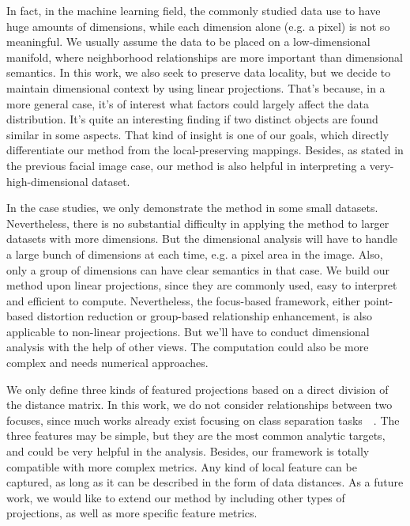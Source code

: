 In fact, in the machine learning field, the commonly studied data use to have huge amounts of dimensions, while each dimension alone (e.g. a pixel) is not so meaningful. We usually assume the data to be placed on a low-dimensional manifold, where neighborhood relationships are more important than dimensional semantics. In this work, we also seek to preserve data locality, but we decide to maintain dimensional context by using linear projections. That's because, in a more general case, it's of interest what factors could largely affect the data distribution. It's quite an interesting finding if two distinct objects are found similar in some aspects. That kind of insight is one of our goals, which directly differentiate our method from the local-preserving mappings. Besides, as stated in the previous facial image case, our method is also helpful in interpreting a very-high-dimensional dataset.

In the case studies, we only demonstrate the method in some small datasets. Nevertheless, there is no substantial difficulty in applying the method to larger datasets with more dimensions. But the dimensional analysis will have to handle a large bunch of dimensions at each time, e.g. a pixel area in the image. Also, only a group of dimensions can have clear semantics in that case. We build our method upon linear projections, since they are commonly used, easy to interpret and efficient to compute. Nevertheless, the focus-based framework, either point-based distortion reduction or group-based relationship enhancement, is also applicable to non-linear projections. But we'll have to conduct dimensional analysis with the help of other views. The computation could also be more complex and needs numerical approaches.

We only define three kinds of featured projections based on a direct division of the distance matrix. In this work, we do not consider relationships between two focuses, since much works already exist focusing on class separation tasks~\cite{DBLP:conf/ieeevast/ChooLKP10}~\cite{DBLP:journals/cgf/SedlmairTMT12}. The three features may be simple, but they are the most common analytic targets, and could be very helpful in the analysis. Besides, our framework is totally compatible with more complex metrics. Any kind of local feature can be captured, as long as it can be described in the form of data distances. As a future work, we would like to extend our method by including other types of projections, as well as more specific feature metrics.


